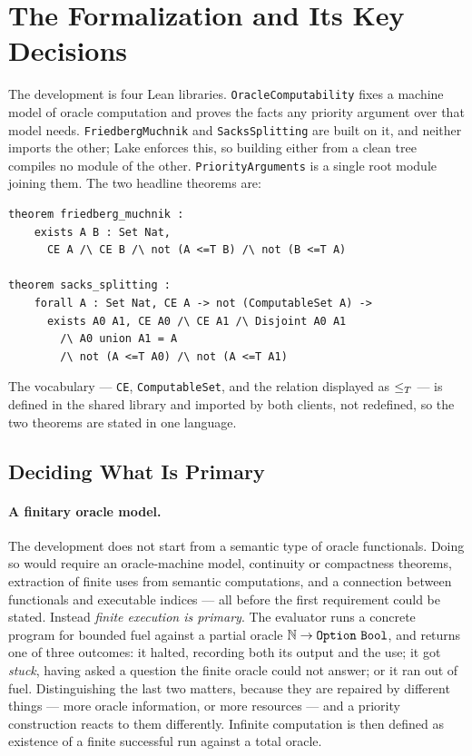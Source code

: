\section{The Formalization and Its Key Decisions}
\label{sec:formalization}

The development is four Lean libraries.  \texttt{OracleComputability} fixes
a machine model of oracle computation and proves the facts any priority
argument over that model needs.  \texttt{FriedbergMuchnik} and
\texttt{SacksSplitting} are built on it, and neither imports the other;
Lake enforces this, so building either from a clean tree compiles no module
of the other.  \texttt{PriorityArguments} is a single root module joining
them.  The two headline theorems are:

\begin{lstlisting}
theorem friedberg_muchnik :
    exists A B : Set Nat,
      CE A /\ CE B /\ not (A <=T B) /\ not (B <=T A)

theorem sacks_splitting :
    forall A : Set Nat, CE A -> not (ComputableSet A) ->
      exists A0 A1, CE A0 /\ CE A1 /\ Disjoint A0 A1
        /\ A0 union A1 = A
        /\ not (A <=T A0) /\ not (A <=T A1)
\end{lstlisting}

The vocabulary --- \texttt{CE}, \texttt{ComputableSet}, and the relation
displayed as $\leq_T$ --- is defined in the shared library and imported by
both clients, not redefined, so the two theorems are stated in one
language.

\subsection{Deciding What Is Primary}

\paragraph{A finitary oracle model.}
The development does not start from a semantic type of oracle functionals.
Doing so would require an oracle-machine model, continuity or compactness
theorems, extraction of finite uses from semantic computations, and a
connection between functionals and executable indices --- all before the
first requirement could be stated.  Instead \emph{finite execution is
primary}.  The evaluator runs a concrete program for bounded fuel against a
partial oracle $\mathbb{N} \to \mathtt{Option}\ \mathtt{Bool}$, and returns one of
three outcomes: it halted, recording both its output and the use; it got
\emph{stuck}, having asked a question the finite oracle could not answer;
or it ran out of fuel.  Distinguishing the last two matters, because they
are repaired by different things --- more oracle information, or more
resources --- and a priority construction reacts to them differently.
Infinite computation is then defined as existence of a finite successful
run against a total oracle.

